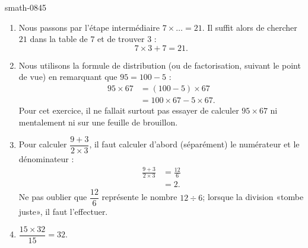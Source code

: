 
\begin{corrige}{smath-0845}

    \begin{enumerate}
        \item
            Nous passons par l'étape intermédiaire \( 7\times \ldots=21\). Il suffit alors de chercher \( 21\) dans la table de \( 7\) et de trouver \( 3\) :
            \begin{equation}
                7\times 3+7=21.
            \end{equation}
        \item
            Nous utilisons la formule de distribution (ou de factorisation, suivant le point de vue) en remarquant que \( 95=100-5\) :
            \begin{subequations}
                \begin{align}
                    95\times 67&=(100-5)\times 67\\
                    &=100\times 67-5\times 67.
                \end{align}
            \end{subequations}
            Pour cet exercice, il ne fallait surtout pas essayer de calculer \( 95\times 67\) ni mentalement ni sur une feuille de brouillon.
        \item
            Pour calculer \( \dfrac{ 9+ 3 }{ 2\times 3 }\), il faut calculer d'abord (séparément) le numérateur et le dénominateur :
            \begin{subequations}
                \begin{align}
                    \frac{ 9+3 }{ 2\times 3 }&=\frac{ 12 }{ 6 }\\
                    &=2.
                \end{align}
            \end{subequations}
            Ne pas oublier que \( \dfrac{ 12 }{ 6 }\) représente le nombre \( 12\div 6\); lorsque la division «tombe juste», il faut l'effectuer.
        \item
            \( \dfrac{ 15\times 32 }{ 15 }=32\).
    \end{enumerate}

\end{corrige}
